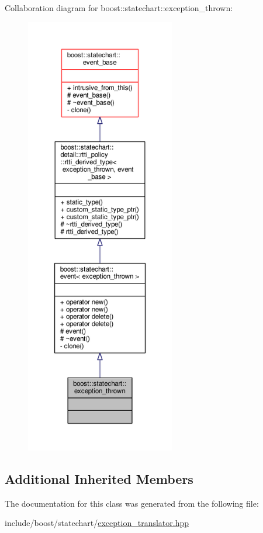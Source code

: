 Collaboration diagram for boost\+:\+:statechart\+:\+:exception\+\_\+thrown\+:
\nopagebreak
\begin{figure}[H]
\begin{center}
\leavevmode
\includegraphics[height=550pt]{classboost_1_1statechart_1_1exception__thrown__coll__graph}
\end{center}
\end{figure}
\subsection*{Additional Inherited Members}


The documentation for this class was generated from the following file\+:\begin{DoxyCompactItemize}
\item 
include/boost/statechart/\mbox{\hyperlink{exception__translator_8hpp}{exception\+\_\+translator.\+hpp}}\end{DoxyCompactItemize}
